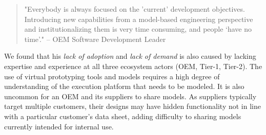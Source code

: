 \begin{quote}
"Everybody is always focused on the 'current' development objectives.
Introducing new capabilities from a model-based engineering perspective and institutionalizing them is very time consuming, and people ‘have no time’." 
-- OEM Software Development Leader
\end{quote}

We found that his \emph{lack of adoption} and \emph{lack of demand} 
is also caused by lacking expertise and experience at all three ecosystem actors (OEM, Tier-1, Tier-2).
The use of virtual prototyping tools and models requires a high degree of understanding of the execution platform that needs to be modeled.
%
%
It is also uncommon for an OEM and its suppliers to share models.
As suppliers typically target multiple customers, their designs may have hidden functionality not in line with a particular customer’s data sheet,
adding difficulty to sharing models currently intended for internal use.




